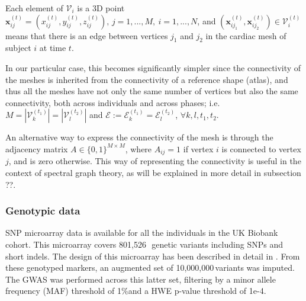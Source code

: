 \documentclass[twocolumn]{llncs}
\newcommand{\NCALLS}{801,526\,} %
\newcommand{\MAFTHR}{1\%} %
\newcommand{\NIMP}{10,000,000\,} %
\newcommand{\HWEPVAL}{1e-4} %
\begin{document}
Each element of $\mathcal{V}_i$ is a 3D point $\textbf{x}_{ij}^{(t)}=(x_{ij}^{(t)}, y_{ij}^{(t)}, z_{ij}^{(t)}),\, j=1,...,M,\ i=1,...,N$, and $(\textbf{x}_{ij_1}^{(t)}, \textbf{x}_{ij_2}^{(t)})\in\mathcal{V}_i^{(t)}$ means that there is an edge between vertices $j_1$ and $j_2$ in the cardiac mesh of subject $i$ at time $t$.

In our particular case, this becomes significantly simpler since the connectivity of the meshes is inherited from the connectivity of a reference shape (atlas), and thus all the meshes have not only the same number of vertices but also the same connectivity, both across individuals and across phases; i.e. $M=|\mathcal{V}_k^{(t_1)}|=|\mathcal{V}_l^{(t_2)}|$ and $
\mathcal{E}:=\mathcal{E}_{k}^{(t_1)}=\mathcal{E}_{l}^{(t_2)}$, $\forall k, l, t_1, t_2$.

An alternative way to express the connectivity of the mesh is through the adjacency matrix $A\in\{0,1\}^{M\times M}$, where $A_{ij}=1$ if vertex $i$ is connected to vertex $j$, and is zero otherwise. This way of representing the connectivity is useful in the context of spectral graph theory, as will be explained in more detail in subsection ??.


\subsubsection{Genotypic data}
SNP microarray data is available for all the individuals in the UK Biobank cohort. This microarray covers \NCALLS\, genetic variants including SNPs and short indels. The design of this microarray has been described in detail in \cite{ref_ukbb_genetics}. From these genotyped markers, an augmented set of \NIMP variants was imputed. The GWAS was performed across this latter set, filtering by a minor allele frequency (MAF) threshold of \MAFTHR and a HWE p-value threshold of \HWEPVAL.
\end{document}
